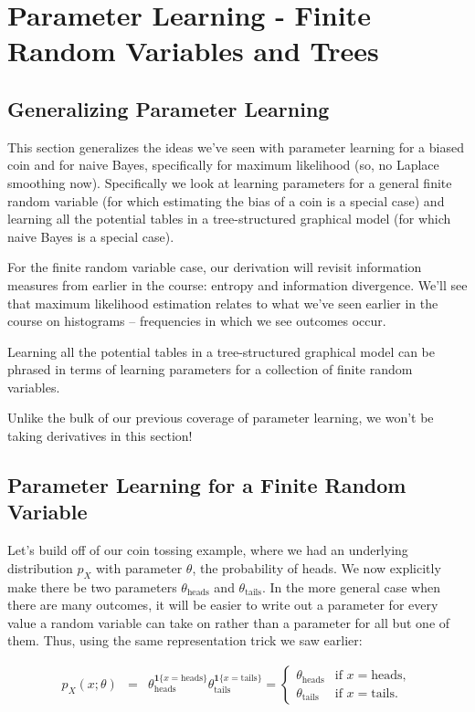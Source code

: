 
\graphicspath{ {images/frvt/} }

\section{Parameter Learning - Finite Random Variables and Trees}

\subsection{Generalizing Parameter Learning}

This section generalizes the ideas we've seen with parameter learning for a biased coin and for naive Bayes, specifically for maximum likelihood (so, no Laplace smoothing now). Specifically we look at learning parameters for a general finite random variable (for which estimating the bias of a coin is a special case) and learning all the potential tables in a tree-structured graphical model (for which naive Bayes is a special case).

For the finite random variable case, our derivation will revisit information measures from earlier in the course: entropy and information divergence. We'll see that maximum likelihood estimation relates to what we've seen earlier in the course on histograms -- frequencies in which we see outcomes occur.

Learning all the potential tables in a tree-structured graphical model can be phrased in terms of learning parameters for a collection of finite random variables.

Unlike the bulk of our previous coverage of parameter learning, we won't be taking derivatives in this section!


\subsection{Parameter Learning for a Finite Random Variable}

Let's build off of our coin tossing example, where we had an underlying distribution $p_X$ with parameter $\theta$, the probability of heads. We now explicitly make there be two parameters $\theta _{\text {heads}}$ and $\theta _{\text {tails}}$. In the more general case when there are many outcomes, it will be easier to write out a parameter for every value a random variable can take on rather than a parameter for all but one of them. Thus, using the same representation trick we saw earlier:

\begin{eqnarray*}
p_{X}(x;\theta)&=&\theta_{\text{heads}}^{\mathbf{1}\{x=\text{heads}\}}\theta_{\text{tails}}^{\mathbf{1}\{x=\text{tails}\}}=\begin{cases}
\theta_{\text{heads}} & \text{if }x=\text{heads},\\
\theta_{\text{tails}} & \text{if }x=\text{tails}.
\end{cases}
\end{eqnarray*}

